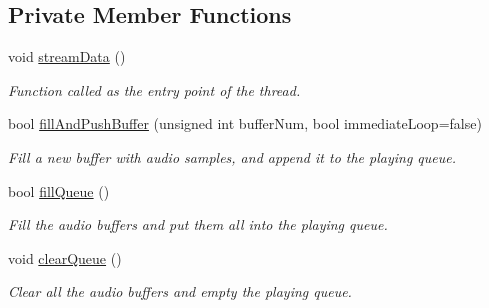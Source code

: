 \subsection*{Private Member Functions}
\begin{DoxyCompactItemize}
\item 
void \mbox{\hyperlink{classsf_1_1_sound_stream_a08c54af1f433424ac627d1a30021f5e9}{stream\+Data}} ()
\begin{DoxyCompactList}\small\item\em Function called as the entry point of the thread. \end{DoxyCompactList}\item 
bool \mbox{\hyperlink{classsf_1_1_sound_stream_ad3e04f1b4df1fbe0ffd474f47ed91f4a}{fill\+And\+Push\+Buffer}} (unsigned int buffer\+Num, bool immediate\+Loop=false)
\begin{DoxyCompactList}\small\item\em Fill a new buffer with audio samples, and append it to the playing queue. \end{DoxyCompactList}\item 
bool \mbox{\hyperlink{classsf_1_1_sound_stream_abf8cdcc65da5e31c14f9bddccb53fb72}{fill\+Queue}} ()
\begin{DoxyCompactList}\small\item\em Fill the audio buffers and put them all into the playing queue. \end{DoxyCompactList}\item 
void \mbox{\hyperlink{classsf_1_1_sound_stream_ac0fdfe8ec3e5b662f0b7956ba894f5bc}{clear\+Queue}} ()
\begin{DoxyCompactList}\small\item\em Clear all the audio buffers and empty the playing queue. \end{DoxyCompactList}\end{DoxyCompactItemize}
